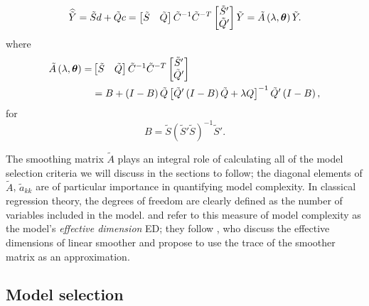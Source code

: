 \documentclass[12pt]{article}
\newcommand{\tildeY}{\tilde{Y}}
\newcommand{\tildeQ}{\tilde{Q}}
\newcommand{\tildeA}{\tilde{A}}
\newcommand{\bftheta}{\mbox{\boldmath $\theta$}}
\newcommand{\tildeS}{\tilde{S}}
\theoremstyle{definition}
\begin{document}
\begin{equation} \label{eq:tildeY-hat-equals-tildeA-tildeY}
\widehat{\tildeY} = \tildeS d + \tildeQ c = \begin{bmatrix} \tildeS & \tildeQ \end{bmatrix} \tilde{C}^{-1} \tilde{C}^{-T} \begin{bmatrix} \tildeS' \\ \tildeQ' \end{bmatrix} \tildeY = \tildeA\left(\lambda, \bftheta\right) \tildeY.
\end{equation} 
\noindent
where
\begin{align}
\begin{split} \label{eq:cholesky-tildeA}
\tildeA\left(\lambda, \bftheta \right) =& \begin{bmatrix} \tildeS & \tildeQ \end{bmatrix} \tilde{C}^{-1} \tilde{C}^{-T} \begin{bmatrix} \tildeS' \\ \tildeQ' \end{bmatrix}  \\
&= B + \left(I - B\right) \tildeQ \left[\tildeQ'\left( I - B \right)\tildeQ + \lambda Q\right]^{-1} \tildeQ'\left(I - B\right),
\end{split}
\end{align} 
\noindent
for
\[
B = \tildeS\left(\tildeS' \tildeS \right)^{-1}\tildeS'.
\]


The smoothing matrix $\tildeA$ plays an integral role of calculating all of the model selection criteria we will discuss in the sections to follow;  the diagonal elements of $\tildeA$, $\tilde{a}_{kk}$ are of particular importance in quantifying  model complexity. In classical regression theory, the degrees of freedom are clearly defined as the number of variables included in the model. \citet{eilers1996flexible} and\citet{marx2005multidimensional} refer to this measure of model complexity as the model's \emph{effective dimension} ED; they follow \citet{hastie1990generalized}, who discuss the effective dimensions of linear smoother and propose to use the trace of the smoother matrix as an approximation. 

\subsection{Model selection}
\end{document}
